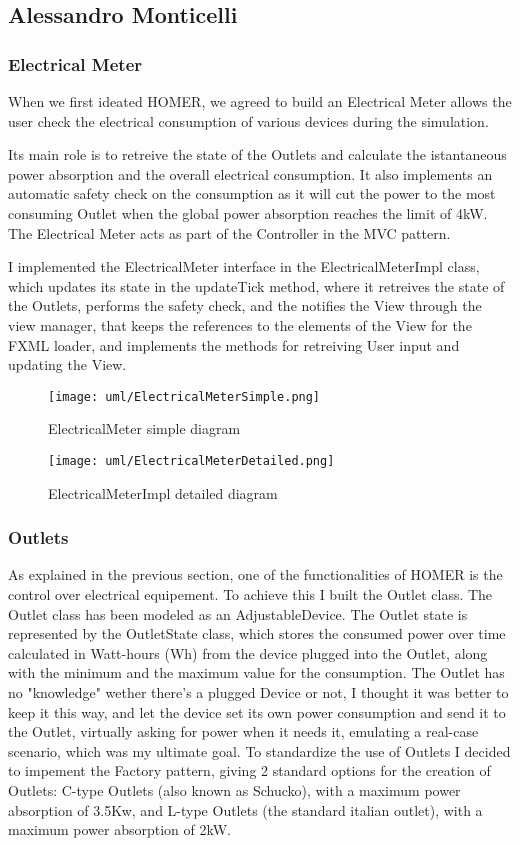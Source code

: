 \subsection{Alessandro Monticelli}
\subsubsection*{Electrical Meter}
When we first ideated HOMER, we agreed to build an Electrical Meter allows the user check the electrical consumption of various devices during the simulation.

Its main role is to retreive the state of the Outlets and calculate the istantaneous power absorption and the overall electrical consumption.
It also implements an automatic safety check on the consumption as it will cut the power to the most consuming Outlet when the global power absorption reaches the limit of 4kW.
The Electrical Meter acts as part of the Controller in the MVC pattern. 

I implemented the ElectricalMeter interface in the ElectricalMeterImpl class, which updates its state in the updateTick method, where it retreives the state of the Outlets, 
performs the safety check, and the notifies the View through the view manager, that keeps the references to the elements of the View for the FXML loader, 
and implements the methods for retreiving User input and updating the View.

\begin{figure}[H]
    \centering{}
    \texttt{[image: uml/ElectricalMeterSimple.png]}
    \caption{ElectricalMeter simple diagram}
    \label{monticelli:uml:simpleMeter}
\end{figure}

\begin{figure}[H]
    \centering{}
    \texttt{[image: uml/ElectricalMeterDetailed.png]}
    \caption{ElectricalMeterImpl detailed diagram}
    \label{monticelli:uml:detailedMeter}
\end{figure}

\subsubsection{Outlets}
As explained in the previous section, one of the functionalities of HOMER is the control over electrical equipement. To achieve this I built the Outlet class.
The Outlet class has been modeled as an AdjustableDevice.
The Outlet state is represented by the OutletState class, which stores the consumed power over time calculated in Watt-hours (Wh) from the device plugged into the Outlet, along with the minimum and the maximum value for the consumption.
The Outlet has no "knowledge" wether there's a plugged Device or not, I thought it was better to keep it this way, and let the device set its own power consumption and send it to the Outlet, virtually asking for power when it needs it, emulating a real-case scenario, 
which was my ultimate goal.
To standardize the use of Outlets I decided to impement the Factory pattern, giving 2 standard options for the creation of Outlets: C-type Outlets (also known as Schucko), with a maximum power absorption of 3.5Kw, 
and L-type Outlets (the standard italian outlet), with a maximum power absorption of 2kW.

